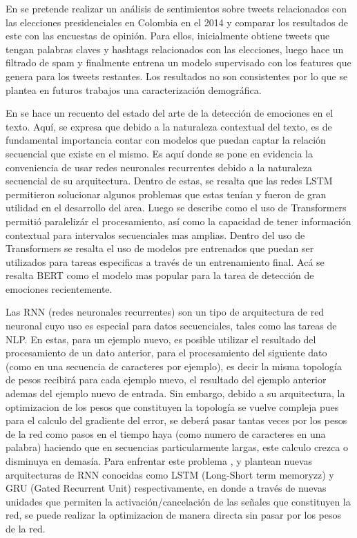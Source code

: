 En \cite{ceron2016sentiment} se pretende realizar un análisis de sentimientos sobre tweets relacionados con las elecciones presidenciales en Colombia en el 2014 y comparar los resultados de este con las encuestas de opinión. Para ellos, inicialmente obtiene tweets que tengan  palabras claves y hashtags relacionados con las elecciones, luego hace un filtrado de spam y finalmente entrena un modelo supervisado con los features que genera para los tweets restantes. Los resultados no son consistentes por lo que se plantea en futuros trabajos  una caracterización demográfica.




En \cite{acheampong2021transformer} se hace un recuento del estado del arte de la detección de emociones en el texto. Aquí, se expresa que debido a la naturaleza contextual del texto, es de fundamental importancia contar con modelos que puedan captar la relación secuencial que existe en el mismo. Es aquí donde se pone en evidencia la conveniencia de usar redes neuronales recurrentes debido a la naturaleza secuencial de su arquitectura. Dentro de estas, se resalta que las redes LSTM permitieron solucionar algunos problemas que estas tenían y fueron de gran utilidad en el desarrollo del area. Luego se describe como el uso de Transformers permitió paralelizár el procesamiento, así como la capacidad de tener información contextual para intervalos secuenciales mas amplias. Dentro del uso de Transformers se resalta el uso de modelos pre entrenados que puedan ser utilizados para tareas especificas a través de un entrenamiento final. Acá se resalta BERT como el modelo mas popular para la tarea de detección de emociones recientemente.



Las RNN (redes neuronales recurrentes) son un tipo de arquitectura de red neuronal cuyo uso es especial para datos secuenciales, tales como las tareas de NLP. En estas, para un ejemplo nuevo, es posible utilizar el resultado del procesamiento de un dato anterior, para el procesamiento del siguiente dato (como en una secuencia de caracteres por ejemplo), es decir la misma topología de pesos recibirá para cada ejemplo nuevo, el resultado del ejemplo anterior ademas del ejemplo nuevo de entrada. Sin embargo, debido a su arquitectura, la optimizacion de los pesos que constituyen la topología se vuelve compleja pues para el calculo del gradiente del error, se deberá pasar tantas veces por los pesos de la red como pasos en el tiempo haya (como numero de caracteres en una palabra) haciendo que en secuencias particularmente largas, este calculo crezca o disminuya en demasía. Para enfrentar este problema , \cite{hochreiter1997long} y \cite{chung2014empirical} plantean nuevas arquitecturas de RNN conocidas como LSTM (Long-Short term memoryzz) y GRU (Gated Recurrent Unit) respectivamente, en donde a través de nuevas unidades que permiten la activación/cancelación de las señales que constituyen la red, se puede realizar la optimizacion de manera directa sin pasar por los pesos de la red.


